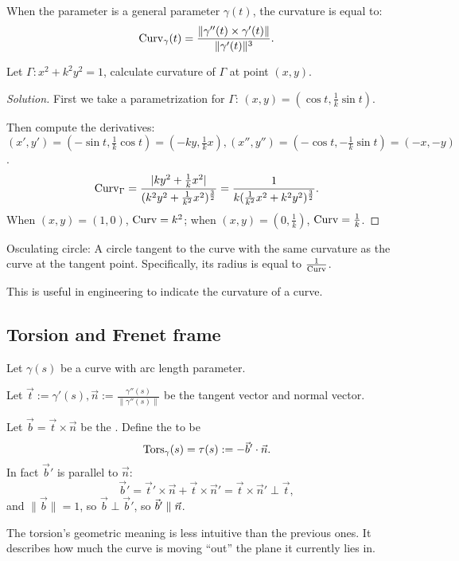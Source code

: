 \begin{proposition}
    When the parameter is a general parameter $\gamma(t)$, the curvature is equal to:
	\[
	\operatorname{Curv}_\gamma(t) = \frac{\lVert\gamma''(t) \times \gamma'(t)\rVert}
	{\lVert\gamma'(t)\rVert^3}.
	\]
\end{proposition}
\begin{example}
    Let $\Gamma: x^2+k^2y^2 = 1$, calculate curvature of $\Gamma$ at point $(x,y)$.
\end{example}
\begin{proof}[Solution]
    First we take a parametrization for $\Gamma$:
	$(x, y) = (\cos t, \frac{1}{k}\sin t)$.

	Then compute the derivatives:
	$(x', y') = (-\sin t, \frac{1}{k}\cos t) = (-ky, \frac{1}{k}x),
	(x'', y'') = (-\cos t,-\frac{1}{k}\sin t) = (-x, -y)$.
	\[
	\operatorname{Curv}_\Gamma = \frac{|ky^2 + \frac{1}{k}x^2|}
	{(k^2y^2+\frac{1}{k^2}x^2)^{\frac{3}{2}}}
	= \frac{1}{k(\frac{1}{k^2}x^2 + k^2y^2)^{\frac{3}{2}}}.
	\]
	When $(x,y)=(1,0)$,  $\operatorname{Curv} = k^2$; when $(x,y)=(0,\frac{1}{k})$,
	$\operatorname{Curv} = \frac{1}{k}$.
\end{proof}
\begin{remark}
    Osculating circle: A circle tangent to the curve with
	the same curvature as the curve at the tangent point.
	Specifically, its radius is equal to $\frac{1}{\operatorname{Curv}}$.

	This is useful in engineering to indicate the curvature
	of a curve.
\end{remark}

\subsection{Torsion and Frenet frame}
\label{sub:Torsion and Frenet frame}
\begin{definition}[Torsion]
	Let $\gamma(s)$ be a curve with arc length parameter.

	Let $\vec{t}:=\gamma'(s), \vec{n}:=\frac{\gamma''(s)}{\lVert\gamma''(s)\rVert}$
	be the tangent vector and normal vector.

	Let $\vec{b} = \vec{t}\times \vec{n}$ be the .
	Define the  to be
	\[
	\operatorname{Tors}_\gamma(s) = \tau(s) := - \vec{b}' \cdot \vec{n}.
	\]
	In fact $\vec{b}'$ is parallel to $\vec{n}$:
	\[
	\vec{b}'= \vec{t}'\times \vec{n} + \vec{t}\times \vec{n}'
	= \vec{t}\times\vec{n}'\perp\vec{t},
	\]
	and $\lVert \vec{b}\rVert = 1$, so $\vec{b}\perp\vec{b}'$,
	so $\vec{b}' \parallel \vec{n}$.
\end{definition}

The torsion's geometric meaning is less intuitive than the previous ones.
It describes how much the curve is moving ``out'' the plane it currently
lies in.
